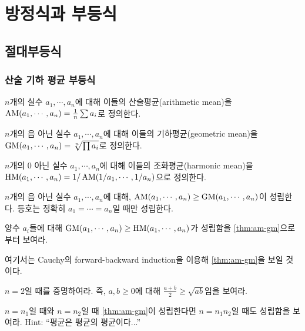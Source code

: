 \part{방정식과 부등식}

\chapter{절대부등식}
\section{산술 기하 평균 부등식}
\begin{definition}
$n$개의 실수 $a_1, \cdots, a_n$에 대해 이들의 산술평균(arithmetic mean)을 $\operatorname{AM}(a_1, \cdots, a_n)=\frac1n \sum a_i$로 정의한다.
\end{definition}
$n$개의 음 아닌 실수 $a_1, \cdots, a_n$에 대해 이들의 기하평균(geometric mean)을 $\operatorname{GM}(a_1, \cdots, a_n)=\sqrt[n]{\prod a_i}$로 정의한다. 
\begin{definition}
$n$개의 0 아닌 실수 $a_1, \cdots, a_n$에 대해 이들의 조화평균(harmonic mean)을 $\operatorname{HM}(a_1, \cdots, a_n)=1/\operatorname{AM}(1/a_1, \cdots, 1/a_n)$으로 정의한다. 
\end{definition}
\begin{theorem}[산술 기하 평균 부등식]\label{thm:am-gm}
$n$개의 음 아닌 실수 $a_1, \cdots, a_n$에 대해, $\operatorname{AM}(a_1, \cdots, a_n)\geq \operatorname{GM}(a_1, \cdots, a_n)$이 성립한다. 등호는 정확히 $a_1=\cdots=a_n$일 때만 성립한다. 
\end{theorem}
\begin{exercise}
양수 $a_i$들에 대해 $\operatorname{GM}(a_1, \cdots, a_n)\geq \operatorname{HM}(a_1, \cdots, a_n)$가 성립함을 \cref{thm:am-gm}으로부터 보여라. 
\end{exercise}
여기서는 Cauchy의 forward-backward induction을 이용해 \cref{thm:am-gm}을 보일 것이다. 
\begin{exercise}
    $n=2$일 때를 증명하여라. 즉, $a, b\geq 0$에 대해 $\frac{a+b}{2}\geq \sqrt{ab}$임을 보여라. 
\end{exercise}
\begin{exercise}    
    $n=n_1$일 때와 $n=n_2$일 때 \cref{thm:am-gm}이 성립한다면 $n=n_1n_2$일 때도 성립함을 보여라. Hint: ``평균은 평균의 평균이다...''
\end{exercise}
